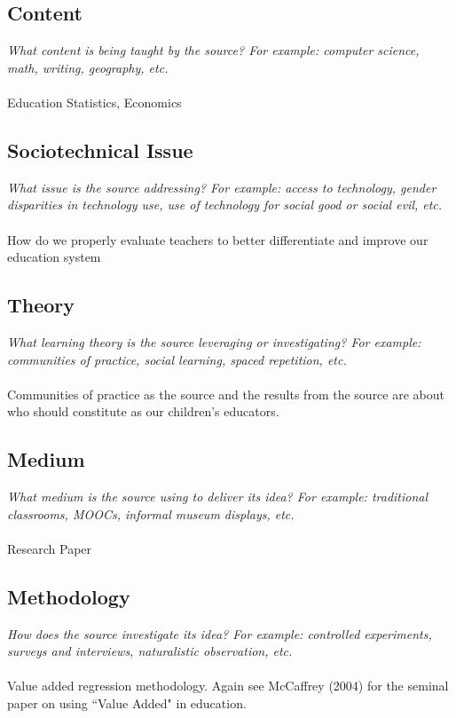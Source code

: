\documentclass[12pt, final]{article}
\begin{document}
\subsection{Content}
\textit{What content is being taught by the source? For example: computer science, math, writing, geography, etc.}
\\
\\
Education Statistics, Economics

\subsection{Sociotechnical Issue}
\textit{What issue is the source addressing? For example: access to technology, gender disparities in technology use, use of technology for social good or social evil, etc.}
\\
\\
How do we properly evaluate teachers to better differentiate and improve our education system

\subsection{Theory}
\textit{What learning theory is the source leveraging or investigating? For example: communities of practice, social learning, spaced repetition, etc.}
\\
\\
Communities of practice as the source and the results from the source are about who should constitute as our children's educators.

\subsection{Medium}
\textit{What medium is the source using to deliver its idea? For example: traditional classrooms, MOOCs, informal museum displays, etc.}
\\
\\
Research Paper

\subsection{Methodology}
\textit{How does the source investigate its idea? For example: controlled experiments, surveys and interviews, naturalistic observation, etc.}
\\
\\
Value added regression methodology. Again see McCaffrey (2004) \cite{McCaffrey} for the seminal paper on using ``Value Added" in education.
\end{document}
